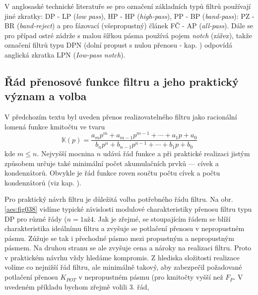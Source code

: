         \begin{mdframed}[style=mdnote]
          \begin{note}
            V anglosaské technické literatuře se pro označení základních typů filtrů používají jiné
            zkratky: DP - LP (\emph{low pass}), HP - HP (\emph{high-pass}), PP - BP
            (\emph{band-pass}): PZ - BR (\emph{band-reject}) a pro fázovací (všepropustný) článek FČ
            - AP (\emph{all-pass}). Dále se pro případ ostré zádrže s malou šířkou pásma používá
            pojem \emph{notch} (zářez), takže označení filtrů typu DPN (dolní propust s nulou
            přenosu - kap. ) odpovídá anglická zkratka LPN
            (\emph{Iow-pass notch}).            
          \end{note}
        \end{mdframed} 

    \subsection{Řád přenosové funkce filtru a jeho praktický význam a volba}
      V předchozím textu byl uveden přenos realizovatelného filtru jako racionální lomená funkce
      kmitočtu ve tvaru
      \begin{equation}\label{aes:eq028}
        \mathbb{K}(p) = \frac{a_mp^m + a_{m-1}p^{m-1} + \cdots + a_1p +a_0}
                             {b_np^n + b_{n-1}p^{n-1} + \cdots + b_1p +b_0}
      \end{equation}
      kde \(m\leq n\). Nejvyšší mocnina \(n\) udává řád funkce a při praktické realizaci jistým
      způsobem určuje také minimální počet akumulačních prvků — cívek a kondenzátorů. Obvykle je řád
      funkce roven součtu počtu cívek a počtu kondenzátorů (viz kap. ). 
      
      Pro praktický návrh filtru je důležitá volba potřebného řádu filtru. Na obr. \ref{aes:fig038}
      vidíme typické závislosti modulové charakteristiky přenosu filtru typu DP pro různé řády (\(n
      = 1 \text{až} 4\). Jak je zřejmé, se stoupajícím řádem se blíží charakteristika ideálnímu
      filtru a zvyšuje se potlačení přenosu v nepropustném pásmu. Zúžuje se tak i přechodné pásmo
      mezi propustným a nepropustným pásmem. Na druhou stranu se ale zvyšuje cena a nároky na
      realizaci filtru. Proto v praktickém návrhu vždy hledáme kompromis. Z hlediska složitosti
      realizace volíme co nejnižší řád filtru, ale minimálně takový, aby zabezpečil požadované
      potlačení přenosu \(K_{POT}\) v nepropustném pásmu (pro kmitočty vyšší než \(F_P\). V uvedeném
      příkladu bychom zřejmě volili \num{3}. řád, 

